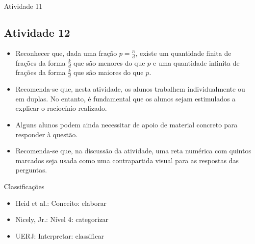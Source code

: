 \begin{multicols}{2}
\begin{resposta*}{Atividade 11}
 \end{resposta*}




\subsection{Atividade 12}

\begin{itemize} %
    \item       Reconhecer que, dada uma fração       $p = \frac{n}{d}$, existe 
um quantidade finita de frações da forma       $\frac{k}{d}$       que são 
menores do que       $p$       e uma quantidade infinita de frações da forma     
  $\frac{k}{d}$       que são maiores do que       $p$.
\end{itemize} %
  
  
 
\begin{itemize} %
    \item       Recomenda-se que, nesta atividade, os alunos trabalhem 
individualmente ou em duplas. No entanto, é fundamental que os alunos sejam 
estimulados a explicar o raciocínio realizado.
    \item       Alguns alunos podem ainda necessitar de apoio de material 
concreto para responder à questão.
    \item       Recomenda-se que, na discussão da atividade, uma reta numérica 
com quintos marcados seja usada como uma contrapartida visual para as respostas 
das perguntas.
\end{itemize} %
  

\noindent {}
  
  
Classificações  
\begin{itemize} %
    \item       Heid et al.: Conceito: elaborar
    \item       Nicely, Jr.: Nível 4: categorizar
    \item       UERJ: Interpretar: classificar
\end{itemize} %
  


\end{multicols}

